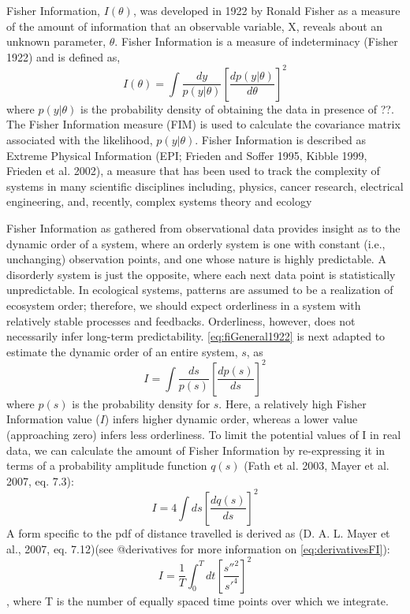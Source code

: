 \documentclass[12pt,twoside,openany]{reedthesis}
\begin{document}
Fisher Information, \(I(\theta)\), was developed in 1922 by Ronald
Fisher as a measure of the amount of information that an observable
variable, X, reveals about an unknown parameter, \(\theta\). Fisher
Information is a measure of indeterminacy (Fisher 1922) and is defined
as,
\begin{equation} 
I(\theta) = \int \frac{dy}{p(y|\theta)}\left[\frac{dp(y|\theta)}{d\theta}\right]^2
\label{eq:fiGeneral1922}
\end{equation}
where \(p(y|\theta)\) is the probability density of obtaining the data
in presence of ??. The Fisher Information measure (FIM) is used to
calculate the covariance matrix associated with the likelihood,
\(p(y|\theta)\). Fisher Information is described as Extreme Physical
Information (EPI; Frieden and Soffer 1995, Kibble 1999, Frieden et al.
2002), a measure that has been used to track the complexity of systems
in many scientific disciplines including, physics, cancer research,
electrical engineering, and, recently, complex systems theory and
ecology

Fisher Information as gathered from observational data provides insight
as to the dynamic order of a system, where an orderly system is one with
constant (i.e., unchanging) observation points, and one whose nature is
highly predictable. A disorderly system is just the opposite, where each
next data point is statistically unpredictable. In ecological systems,
patterns are assumed to be a realization of ecosystem order; therefore,
we should expect orderliness in a system with relatively stable
processes and feedbacks. Orderliness, however, does not necessarily
infer long-term predictability. \eqref{eq:fiGeneral1922} is next adapted
to estimate the dynamic order of an entire system, \(s\), as
\begin{equation} 
I = \int \frac{ds}{p(s)}\left[\frac{dp(s)}{ds}\right]^2
\label{eq:fiAdapted}
\end{equation}
where \(p(s)\) is the probability density for \(s\). Here, a relatively
high Fisher Information value (\(I\)) infers higher dynamic order,
whereas a lower value (approaching zero) infers less orderliness. To
limit the potential values of I in real data, we can calculate the
amount of Fisher Information by re-expressing it in terms of a
probability amplitude function \(q(s)\) (Fath et al. 2003, Mayer et al.
2007, eq. 7.3):
\begin{equation}
I = 4 \int ds\left[\frac{dq(s)}{ds}\right]^2
\label{eq:fiAmplitude}
\end{equation}
A form specific to the pdf of distance travelled is derived as (D. A. L.
Mayer et al., 2007, eq. 7.12)(see @derivatives for more information on
\eqref{eq:derivativesFI}):
\begin{equation} 
\label{eq:derivativesFI}
I = \frac{1}{T} \int_0^T dt\left[\frac{s''^2}{s'^4}\right]^2
\end{equation}
, where T is the number of equally spaced time points over which we
integrate.
\end{document}
